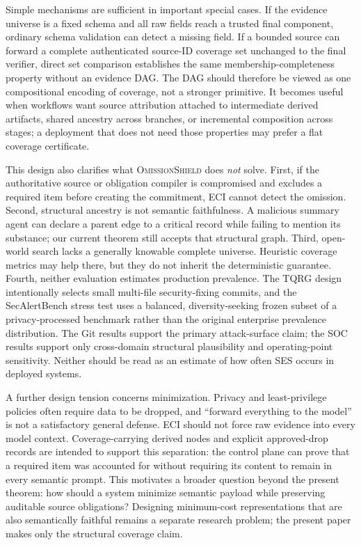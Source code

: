 \documentclass[journal,compsoc]{IEEEtran}
\newcommand{\system}{\textsc{OmissionShield}}
\begin{document}
Simple mechanisms are sufficient in important special cases. If the evidence universe is a fixed schema and all raw fields reach a trusted final component, ordinary schema validation can detect a missing field. If a bounded source can forward a complete authenticated source-ID coverage set unchanged to the final verifier, direct set comparison establishes the same membership-completeness property without an evidence DAG. The DAG should therefore be viewed as one compositional encoding of coverage, not a stronger primitive. It becomes useful when workflows want source attribution attached to intermediate derived artifacts, shared ancestry across branches, or incremental composition across stages; a deployment that does not need those properties may prefer a flat coverage certificate.

This design also clarifies what \system{} does \emph{not} solve. First, if the authoritative source or obligation compiler is compromised and excludes a required item before creating the commitment, ECI cannot detect the omission. Second, structural ancestry is not semantic faithfulness. A malicious summary agent can declare a parent edge to a critical record while failing to mention its substance; our current theorem still accepts that structural graph. Third, open-world search lacks a generally knowable complete universe. Heuristic coverage metrics may help there, but they do not inherit the deterministic guarantee. Fourth, neither evaluation estimates production prevalence. The TQRG design intentionally selects small multi-file security-fixing commits, and the SecAlertBench stress test uses a balanced, diversity-seeking frozen subset of a privacy-processed benchmark rather than the original enterprise prevalence distribution. The Git results support the primary attack-surface claim; the SOC results support only cross-domain structural plausibility and operating-point sensitivity. Neither should be read as an estimate of how often SES occurs in deployed systems.

A further design tension concerns minimization. Privacy and least-privilege policies often require data to be dropped, and ``forward everything to the model'' is not a satisfactory general defense. ECI should not force raw evidence into every model context. Coverage-carrying derived nodes and explicit approved-drop records are intended to support this separation: the control plane can prove that a required item was accounted for without requiring its content to remain in every semantic prompt. This motivates a broader question beyond the present theorem: how should a system minimize semantic payload while preserving auditable source obligations? Designing minimum-cost representations that are also semantically faithful remains a separate research problem; the present paper makes only the structural coverage claim.
\end{document}
